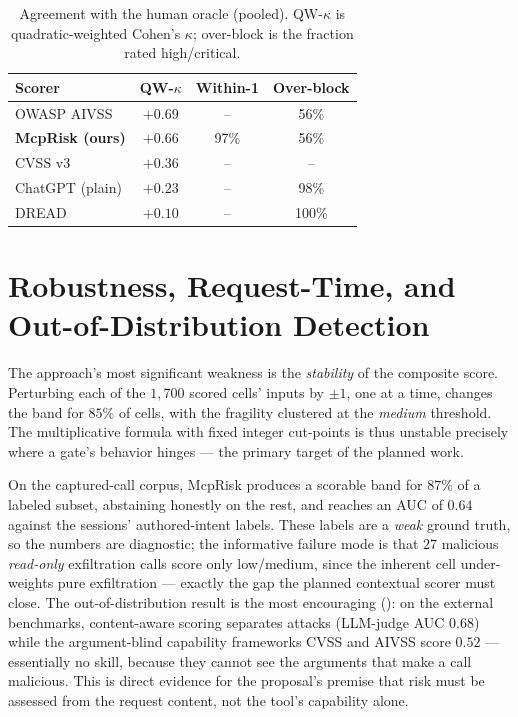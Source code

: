 \begin{table}[H]
    \centering
    \caption{Agreement with the human oracle (pooled). QW-$\kappa$ is
    quadratic-weighted Cohen's $\kappa$; over-block is the fraction rated
    high/critical.}
    \label{tab:headtohead}
    \begin{tabular}{l c c c}
        \hline
        \textbf{Scorer} & \textbf{QW-$\kappa$} & \textbf{Within-1} & \textbf{Over-block} \\
        \hline
        OWASP AIVSS             & $+0.69$ & --    & 56\% \\
        \textbf{McpRisk (ours)} & $+0.66$ & 97\%  & 56\% \\
        CVSS v3                 & $+0.36$ & --    & --   \\
        ChatGPT (plain)         & $+0.23$ & --    & 98\% \\
        DREAD                   & $+0.10$ & --    & 100\% \\
        \hline
    \end{tabular}
\end{table}

\section{Robustness, Request-Time, and Out-of-Distribution Detection}
\label{sec:experiments:dynamic}

The approach's most significant weakness is the \emph{stability} of the composite
score. Perturbing each of the $1{,}700$ scored cells' inputs by $\pm1$, one at a
time, changes the band for $85\%$ of cells, with the fragility clustered at the
\textit{medium} threshold. The multiplicative formula with fixed integer
cut-points is thus unstable precisely where a gate's behavior hinges --- the
primary target of the planned work.

On the captured-call corpus, McpRisk produces a scorable band for $87\%$ of a
labeled subset, abstaining honestly on the rest, and reaches an AUC of $0.64$
against the sessions' authored-intent labels. These labels are a \emph{weak}
ground truth, so the numbers are diagnostic; the informative failure mode is that
$27$ malicious \emph{read-only} exfiltration calls score only low/medium, since
the inherent cell under-weights pure exfiltration --- exactly the gap the planned
contextual scorer must close. The out-of-distribution result is the most
encouraging (): on the external benchmarks, content-aware
scoring separates attacks (LLM-judge AUC $0.68$) while the argument-blind
capability frameworks CVSS and AIVSS score $0.52$ --- essentially no skill,
because they cannot see the arguments that make a call malicious. This is direct
evidence for the proposal's premise that risk must be assessed from the request
content, not the tool's capability alone.

